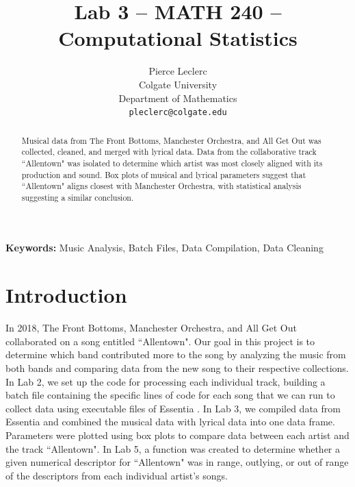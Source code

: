 \documentclass{article}\usepackage[]{graphicx}\usepackage[]{xcolor}
\begin{document}
\vspace{-1in}
\title{Lab 3 -- MATH 240 -- Computational Statistics}

\author{
  Pierce Leclerc \\
  Colgate University  \\
  Department of Mathematics  \\
  {\tt pleclerc@colgate.edu}
}

\date{}

\maketitle

\begin{multicols}{2}
\begin{abstract}

Musical data from The Front Bottoms, Manchester Orchestra, and All Get Out was collected, cleaned, and merged with lyrical data. Data from the collaborative track ``Allentown" was isolated to determine which artist was most closely aligned with its production and sound. Box plots of musical and lyrical parameters suggest that ``Allentown" aligns closest with Manchester Orchestra, with statistical analysis suggesting a similar conclusion.
\end{abstract}

\noindent \textbf{Keywords:} Music Analysis, Batch Files, Data Compilation, Data Cleaning

\section{Introduction}

In 2018, The Front Bottoms, Manchester Orchestra, and All Get Out collaborated on a song entitled ``Allentown". Our goal in this project is to determine which band contributed more to the song by analyzing the music from both bands and comparing data from the new song to their respective collections. In Lab 2, we set up the code for processing each individual track, building a batch file containing the specific lines of code for each song that we can run to collect data using executable files of Essentia \citep{essentia}. In Lab 3, we compiled data from Essentia and combined the musical data with lyrical data into one data frame. Parameters were plotted using box plots to compare data between each artist and the track ``Allentown". In Lab 5, a function was created to determine whether a given numerical descriptor for ``Allentown" was in range, outlying, or out of range of the descriptors from each individual artist's songs.


\end{multicols}
\end{document}
